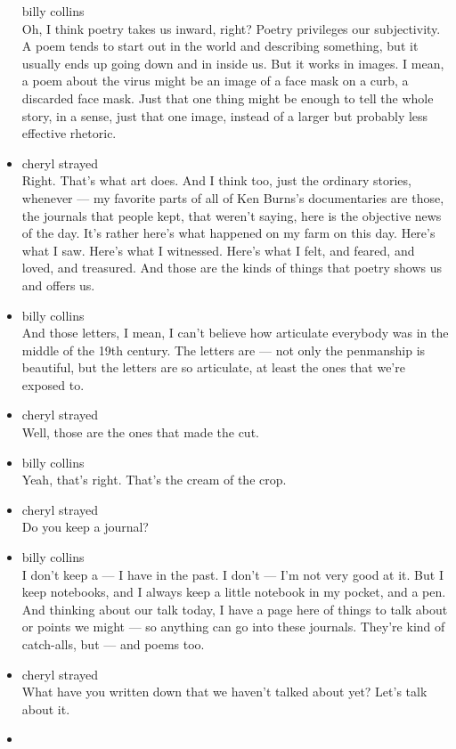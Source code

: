 \begin{itemize}
  billy collins\\
  Oh, I think poetry takes us inward, right? Poetry privileges our
  subjectivity. A poem tends to start out in the world and describing
  something, but it usually ends up going down and in inside us. But it
  works in images. I mean, a poem about the virus might be an image of a
  face mask on a curb, a discarded face mask. Just that one thing might
  be enough to tell the whole story, in a sense, just that one image,
  instead of a larger but probably less effective rhetoric.
\item
  cheryl strayed\\
  Right. That's what art does. And I think too, just the ordinary
  stories, whenever --- my favorite parts of all of Ken Burns's
  documentaries are those, the journals that people kept, that weren't
  saying, here is the objective news of the day. It's rather here's what
  happened on my farm on this day. Here's what I saw. Here's what I
  witnessed. Here's what I felt, and feared, and loved, and treasured.
  And those are the kinds of things that poetry shows us and offers us.
\item
  billy collins\\
  And those letters, I mean, I can't believe how articulate everybody
  was in the middle of the 19th century. The letters are --- not only
  the penmanship is beautiful, but the letters are so articulate, at
  least the ones that we're exposed to.
\item
  cheryl strayed\\
  Well, those are the ones that made the cut.
\item
  billy collins\\
  Yeah, that's right. That's the cream of the crop.
\item
  cheryl strayed\\
  Do you keep a journal?
\item
  billy collins\\
  I don't keep a --- I have in the past. I don't --- I'm not very good
  at it. But I keep notebooks, and I always keep a little notebook in my
  pocket, and a pen. And thinking about our talk today, I have a page
  here of things to talk about or points we might --- so anything can go
  into these journals. They're kind of catch-alls, but --- and poems
  too.
\item
  cheryl strayed\\
  What have you written down that we haven't talked about yet? Let's
  talk about it.
\item

\end{itemize}
